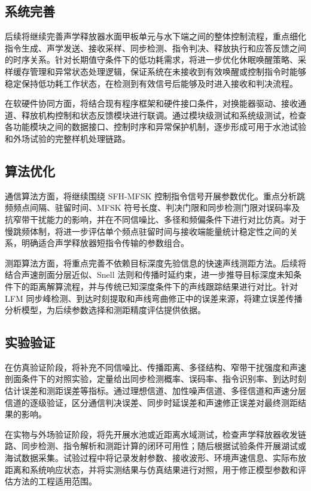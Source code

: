 \subsection{系统完善}

后续将继续完善声学释放器水面甲板单元与水下端之间的整体控制流程，重点细化指令生成、声学发送、接收采样、同步检测、指令判决、释放执行和应答反馈之间的时序关系。针对长期值守条件下的低功耗需求，将进一步优化休眠唤醒策略、采样缓存管理和异常状态处理逻辑，保证系统在未接收到有效唤醒或控制指令时能够稳定保持低功耗工作状态，在检测到有效信号后能够及时进入接收和判决流程。

在软硬件协同方面，将结合现有程序框架和硬件接口条件，对换能器驱动、接收通道、释放机构控制和状态反馈模块进行联调。通过模块级测试和系统级测试，检查各功能模块之间的数据接口、控制时序和异常保护机制，逐步形成可用于水池试验和外场试验的完整样机处理链路。

\subsection{算法优化}

通信算法方面，将继续围绕 SFH-MFSK 控制指令信号开展参数优化。重点分析跳频频点间隔、驻留时间、MFSK 符号长度、判决门限和同步检测门限对误码率及抗窄带干扰能力的影响，并在不同信噪比、多径和频偏条件下进行对比仿真。对于慢跳频体制，将进一步评估单个频点驻留时间与接收端能量统计稳定性之间的关系，明确适合声学释放器短指令传输的参数组合。

测距算法方面，将重点完善不依赖目标深度先验信息的快速声线测距方法。后续将结合声速剖面分层近似、Snell 法则和传播时延约束，进一步推导目标深度未知条件下的距离解算流程，并与传统已知深度条件下的声线跟踪结果进行对比。针对 LFM 同步峰检测、到达时刻提取和声线弯曲修正中的误差来源，将建立误差传播分析模型，为后续参数选择和测距精度评估提供依据。

\subsection{实验验证}

在仿真验证阶段，将补充不同信噪比、传播距离、多径结构、窄带干扰强度和声速剖面条件下的对照实验，定量给出同步检测概率、误码率、指令识别率、到达时刻估计误差和测距误差等指标。通过理想信道、加性噪声信道、多径信道和声速分层信道的逐级验证，区分通信判决误差、同步时延误差和声速修正误差对最终测距结果的影响。

在实物与外场验证阶段，将先开展水池或近距离水域测试，检查声学释放器收发链路、同步检测、指令解析和测距计算的闭环可用性；随后根据试验条件开展湖试或海试数据采集。试验过程中将记录发射参数、接收波形、环境声速信息、实际布放距离和系统响应状态，并将实测结果与仿真结果进行对照，用于修正模型参数和评估方法的工程适用范围。


